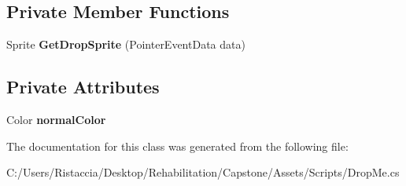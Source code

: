 \subsection*{Private Member Functions}
\begin{DoxyCompactItemize}
\item 
\mbox{\label{class_drop_me_ad6284d54a62e6b3630af5bafb88bc35b}} 
Sprite {\bfseries Get\+Drop\+Sprite} (Pointer\+Event\+Data data)
\end{DoxyCompactItemize}
\subsection*{Private Attributes}
\begin{DoxyCompactItemize}
\item 
\mbox{\label{class_drop_me_aa41ab59fb1088070438210366c19f8cf}} 
Color {\bfseries normal\+Color}
\end{DoxyCompactItemize}


The documentation for this class was generated from the following file\+:\begin{DoxyCompactItemize}
\item 
C\+:/\+Users/\+Ristaccia/\+Desktop/\+Rehabilitation/\+Capstone/\+Assets/\+Scripts/Drop\+Me.\+cs\end{DoxyCompactItemize}
